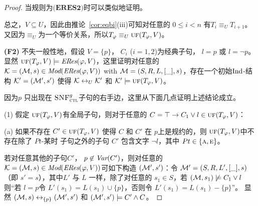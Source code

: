 \begin{proof}
	当规则为$\textbf{(ERES2)}$时可以类似地证明。
	
	总之，$V\subseteq U$，因此由推论~\ref{cor:eqbi}(iii)可知对任意的 $0 \leq i < n$ 有$T_i \equiv_U T_{i+1}$。
	又因为$\equiv_U$为一个等价关系，所以$T_{\varphi} \equiv_U \textsc{uf}(T_\varphi,V)$。
	
	
	
	\textbf{(F2)} 不失一般性地，假设 $V=\{p\}$， $C_i$ ($i=1,2$)为经典子句，  $l = p$ 或 $l = \neg p$。
	显然 $\textsc{uf}(T_\varphi,V) \models \emph{ERes}(\varphi,V)$，这里证明对任意的 ${\cal K}=({\cal M}, s)\in \textit{Mod}(\emph{ERes}(\varphi,V))$ with ${\cal M}=(S, R, L, [\_], s)$，存在一个初始$\textrm{Ind}$-结构 ${\cal K}'=({\cal M}', s')$ 使得 ${\cal K} \leftrightarrow_{U} {\cal K}'$ 和 ${\cal K}' \models \textsc{uf}(T_\varphi,V)$。
	
	
	因为$p$ 只出现在 ${\textsc{SNF}_{\textsc{ctl}}^g}$子句的右手边，这里从下面几点证明上述结论成立。
	
	(1) 假定 $\textsc{uf}(T_\varphi,V)$有全局子句，则对于任意的 $C=\top\rightarrow C_1 \vee l \in \textsc{uf}(T_\varphi,V)$：
	
	(a) 如果不存在 $C'\in \textsc{uf}(T_\varphi,V)$ 使得 $C$ 和 $C'$ 在 $p$上是规约的，则 $\textsc{uf}(T_\varphi,V)$中不存在除了 $Pt$-某时 子句之外的子句 $C'$ 包含文字 $\neg l$，其中 $Pt\in \{\textsc{a}, \textsc{e}\}$。
	
	若对任意其他的子句$C'$， $p\not \in \textit{Var}(C')$，则对任意的 ${\cal K}=({\cal M}, s)\in \textit{Mod}(\emph{ERes}(\varphi,V))$可如下构造 $({\cal M}',s')$：令 ${\cal M}'= (S, R, L',[\_], s)$ （即 $s'=s$），其中$L'$ 与 $L$ 一样，除了对任意的 $s_1\in S$，若 $({\cal M}, s_1) \not \models C_1 \vee l$则“若 $l=p$令 $L'(s_1) = L(s_1) \cup \{p\}$，否则令 $L'(s_1) = L(s_1) - \{p\}$”。
	显然 $({\cal M}, s) \leftrightarrow_{\{p\}} ({\cal M}', s')$ 和 $({\cal M}', s') \models C' \wedge C$。
	

\end{proof}
